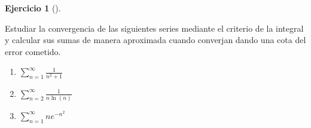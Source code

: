 \documentclass[
  spanish,
  a4paper,
]{scrreport}
\theoremstyle{definition}
\newtheorem{exercise}{Ejercicio}[chapter]
\theoremstyle{remark}
\begin{document}
\begin{exercise}[]\protect\hypertarget{exr-criterio-integral}{}\label{exr-criterio-integral}

Estudiar la convergencia de las siguientes series mediante el criterio
de la integral y calcular sus sumas de manera aproximada cuando
converjan dando una cota del error cometido.

\begin{enumerate}
\def\labelenumi{\alph{enumi}.}
\item
  \(\sum_{n=1}^\infty \frac{1}{n^2+1}\)
\item
  \(\sum_{n=2}^\infty \frac{1}{n\ln(n)}\)
\item
  \(\sum_{n=1}^\infty ne^{-n^2}\)
\end{enumerate}

\end{exercise}
\end{document}
